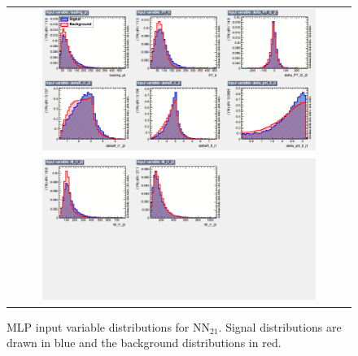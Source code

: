 \begin{figure}[ht]
  \begin{center}
    \begin{tabular}{c}
      \includegraphics[width=0.82\textwidth]{figures/tW/fig/MVA/MLP_2j1b/var_1.png}\\
      \includegraphics[width=0.82\textwidth]{figures/tW/fig/MVA/MLP_2j1b/var_2.png}\\
    \end{tabular}
    \caption{MLP input variable distributions for NN$_{21}$. Signal distributions are drawn in blue and the background distributions in red.}
    \label{fig:input_var_2j1b}
  \end{center}
\end{figure}

